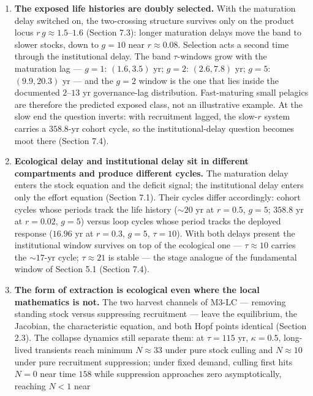 \documentclass[11pt]{article}
\begin{document}
\begin{enumerate}
\def\labelenumi{(\roman{enumi})}
\item
  \textbf{The exposed life histories are doubly selected.} With the
  maturation delay switched on, the two-crossing structure survives only
  on the product locus \(r\,g \approx 1.5\)--\(1.6\) (Section 7.3):
  longer maturation delays move the band to slower stocks, down to
  \(g=10\) near \(r\approx0.08\). Selection acts a second time through
  the institutional delay. The band \(\tau\)-windows grow with the
  maturation lag --- \(g=1\): \((1.6,3.5)\) yr; \(g=2\): \((2.6,7.8)\)
  yr; \(g=5\): \((9.9,20.3)\) yr --- and the \(g=2\) window is the one
  that lies inside the documented \(2\)--\(13\) yr governance-lag
  distribution. Fast-maturing small pelagics are therefore the predicted
  exposed class, not an illustrative example. At the slow end the
  question inverts: with recruitment lagged, the slow-\(r\) system
  carries a \(358.8\)-yr cohort cycle, so the institutional-delay
  question becomes moot there (Section 7.4).
\item
  \textbf{Ecological delay and institutional delay sit in different
  compartments and produce different cycles.} The maturation delay
  enters the stock equation and the deficit signal; the institutional
  delay enters only the effort equation (Section 7.1). Their cycles
  differ accordingly: cohort cycles whose periods track the life history
  (\(\sim 20\) yr at \(r = 0.5\), \(g = 5\); \(358.8\) yr at
  \(r = 0.02\), \(g = 5\)) versus loop cycles whose period tracks the
  deployed response (\(16.96\) yr at \(r = 0.3\), \(g = 5\),
  \(\tau = 10\)). With both delays present the institutional window
  survives on top of the ecological one --- \(\tau \approx 10\) carries
  the \(\sim 17\)-yr cycle; \(\tau \approx 21\) is stable --- the stage
  analogue of the fundamental window of Section 5.1 (Section 7.4).
\item
  \textbf{The form of extraction is ecological even where the local
  mathematics is not.} The two harvest channels of M3-LC --- removing
  standing stock versus suppressing recruitment --- leave the
  equilibrium, the Jacobian, the characteristic equation, and both Hopf
  points identical (Section 2.3). The collapse dynamics still separate
  them: at \(\tau = 115\) yr, \(\kappa = 0.5\), long-lived transients
  reach minimum \(N \approx 33\) under pure stock culling and
  \(N \approx 10\) under pure recruitment suppression; under fixed
  demand, culling first hits \(N = 0\) near time \(158\) while
  suppression approaches zero asymptotically, reaching \(N < 1\) near

\end{enumerate}
\end{document}
